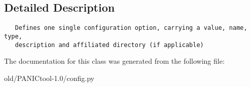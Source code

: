 \subsection{Detailed Description}


\footnotesize\begin{verbatim}
   Defines one single configuration option, carrying a value, name, type,
   description and affiliated directory (if applicable)
\end{verbatim}
\normalsize
 



The documentation for this class was generated from the following file:\begin{CompactItemize}
\item 
old/PANICtool-1.0/config.py\end{CompactItemize}
